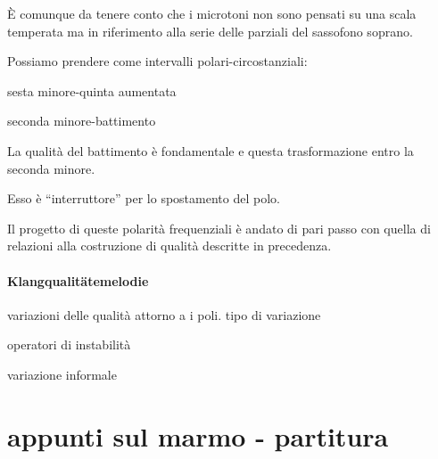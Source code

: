 È comunque da tenere conto che i microtoni non sono pensati su una scala temperata ma
in riferimento alla serie delle parziali del sassofono soprano. 

Possiamo prendere come intervalli polari-circostanziali:

\begin{center}
sesta minore-quinta aumentata
\end{center} 

\begin{center}
seconda minore-battimento 
\end{center} 

La qualità del battimento è fondamentale e questa trasformazione entro la seconda minore.

Esso è “interruttore” per lo spostamento del polo.

Il progetto di queste polarità frequenziali è andato di pari passo con quella di
relazioni alla costruzione di qualità descritte in precedenza.   

\subsection{Klangqualitätemelodie}

variazioni delle qualità attorno a i poli. tipo di variazione 

operatori di instabilità

variazione informale

\part*{appunti sul marmo - partitura}



  


